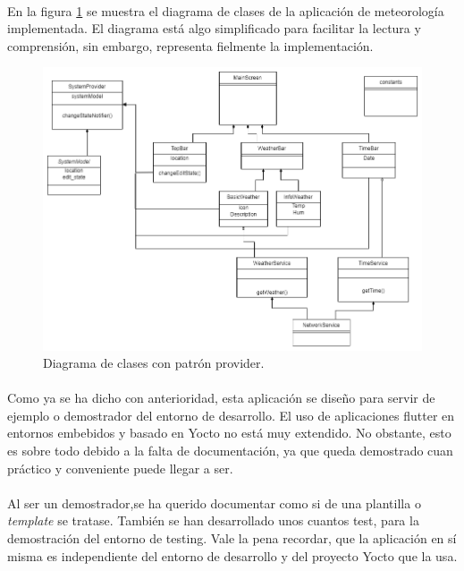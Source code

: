 \paragraph{}En la figura \ref{fig:classDiagram} se muestra el diagrama de clases de la
aplicación de meteorología implementada. El diagrama está algo simplificado para facilitar
la lectura y comprensión, sin embargo, representa fielmente la implementación.

\begin{figure}[H]
	\centering
	\includegraphics[width=0.95\linewidth]{figs/rpi_weather-class_diagram}
	\caption[Patron Provider]{Diagrama de clases con patrón provider.}
	\label{fig:classDiagram}
\end{figure}

\paragraph{}Como ya se ha dicho con anterioridad, esta aplicación se diseño para servir
de ejemplo o demostrador del entorno de desarrollo. El uso de aplicaciones flutter en
entornos embebidos y basado en Yocto no está muy extendido. No obstante, esto es sobre
todo debido a la falta de documentación, ya que queda demostrado cuan práctico y
conveniente puede llegar a ser.

\paragraph{}Al ser un demostrador,se ha querido documentar como si de una plantilla o
\emph{template} se tratase. También se han desarrollado unos cuantos test, para la
demostración del entorno de testing. Vale la pena recordar, que la aplicación en sí
misma es independiente del entorno de desarrollo y del proyecto Yocto que la usa.

